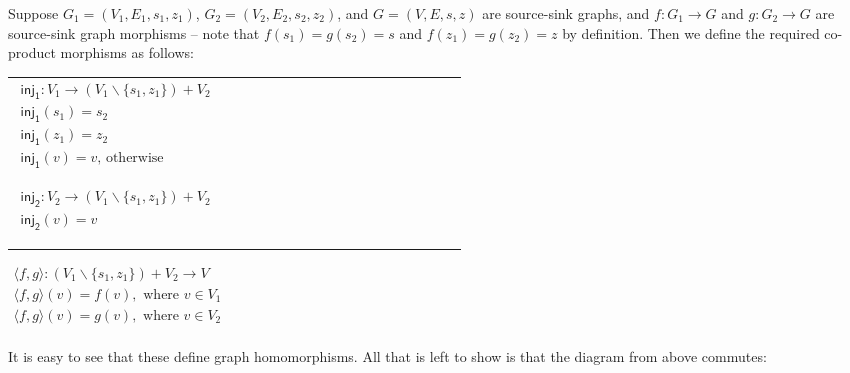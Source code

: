 Suppose $G_1 = (V_1 , E_1, s_1, z_1)$, $G_2 = (V_2 , E_2, s_2, z_2)$,
and $G = (V , E, s, z)$ are source-sink graphs, and $f : G_1 \to G$
and $g : G_2 \to G$ are source-sink graph morphisms -- note that
$f(s_1) = g(s_2) = s$ and $f(z_1) = g(z_2) = z$ by definition.  Then
we define the required co-product morphisms as follows:
\begin{center}
  \begin{tabular}{llllllllllllllllll}
    \begin{math}
    \begin{array}{lll}
      \mathsf{inj_1} : V_1 \to (V_1 \mathop{\backslash} \{s_1,z_1\}) + V_2\\
      \mathsf{inj_1}(s_1) = s_2\\
      \mathsf{inj_1}(z_1) = z_2\\
      \mathsf{inj_1}(v) = v \text{, otherwise}\\
    \end{array}
    \end{math}\\
    \\
    \begin{math}
    \begin{array}{lll}
      \mathsf{inj_2} : V_2 \to (V_1 \mathop{\backslash} \{s_1,z_1\}) + V_2\\
      \mathsf{inj_2}(v) = v\\      \\
    \end{array}
  \end{math}
  \end{tabular}

  \begin{math}
    \begin{array}{lll}
      \langle f , g \rangle : (V_1 \mathop{\backslash} \{s_1,z_1\}) + V_2 \to V\\      
      \langle f , g \rangle(v) = f(v), \text{ where } v \in V_1\\
      \langle f , g \rangle(v) = g(v), \text{ where } v \in V_2\\
    \end{array}
  \end{math}
\end{center}
It is easy to see that these define graph homomorphisms.  All that is
left to show is that the diagram from above commutes:
